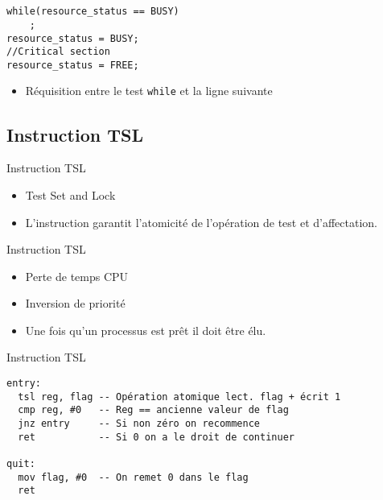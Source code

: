 \def\sectitle{}
\section{\sectitle}
\begin{frame}[containsverbatim]{\sectitle}
\begin{exampleblock}{\subsectitle}
\begin{verbatim}
while(resource_status == BUSY)
    ;
resource_status = BUSY;
//Critical section
resource_status = FREE;
\end{verbatim}
\end{exampleblock}

\begin{alertblock}{\subsectitle}
\begin{itemize}
\item Réquisition entre le test \texttt{while} et la ligne suivante
\end{itemize}
\end{alertblock}
\end{frame}
\def\subsectitle{Instruction TSL}
\subsection{\subsectitle}
\begin{frame}[containsverbatim]{\sectitle}
\begin{block}{\subsectitle}
\begin{itemize}
    \item Test Set and Lock
    \item L'instruction garantit l'atomicité de l'opération de test et
    d'affectation.
\end{itemize}
\end{block}

\begin{block}{\subsectitle}
\begin{itemize}
\item Perte de temps CPU
\item Inversion de priorité
\item Une fois qu'un processus est prêt il doit être élu.
\end{itemize}
\end{block}
\end{frame}

\begin{frame}[containsverbatim]{\sectitle}
\begin{exampleblock}{\subsectitle}
\begin{verbatim}
entry:
  tsl reg, flag -- Opération atomique lect. flag + écrit 1
  cmp reg, #0   -- Reg == ancienne valeur de flag
  jnz entry     -- Si non zéro on recommence
  ret           -- Si 0 on a le droit de continuer

quit:
  mov flag, #0  -- On remet 0 dans le flag
  ret
\end{verbatim}
\end{exampleblock}
\end{frame}

